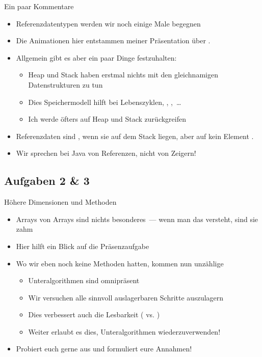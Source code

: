 \begin{frame}{Ein paar Kommentare}
    \begin{itemize}[<+(1)->]
        \itemsep10pt
        \item Referenzdatentypen werden wir noch einige Male begegnen
        \item Die Animationen hier entstammen meiner Präsentation über .
        \item Allgemein gibt es aber ein paar Dinge festzuhalten: \begin{itemize}
            \itemsep1.5pt
            \item Heap und Stack haben erstmal nichts mit den gleichnamigen Datenstrukturen zu tun
            \item Dies Speichermodell hilft bei Lebenszyklen, , \bjava{==},~\ldots
            \item Ich werde öfters auf Heap und Stack zurückgreifen
        \end{itemize}
        \item Referenzdaten sind , wenn sie auf dem Stack liegen, aber auf kein Element .
        \item Wir sprechen bei Java von Referenzen, nicht von Zeigern!
    \end{itemize}
\end{frame}

\subsection{Aufgaben 2 \& 3}
\begin{frame}{Höhere Dimensionen und Methoden}
    \begin{itemize}[<+(1)->]
        \itemsep12pt
        \item Arrays von Arrays sind nichts besonderes~--- wenn man das versteht, sind sie zahm
        \item Hier hilft ein Blick auf die Präsenzaufgabe
        \item Wo wir eben noch keine Methoden hatten, kommen nun unzählige\begin{itemize}
            \item Unteralgorithmen sind omnipräsent
            \item Wir versuchen alle sinnvoll auslagerbaren Schritte auszulagern
            \item Dies verbessert auch die Lesbarkeit ( vs. )
            \item Weiter erlaubt es dies, Unteralgorithmen wiederzuverwenden!
        \end{itemize}
        \item Probiert euch gerne aus und formuliert eure Annahmen!
    \end{itemize}
\end{frame}


